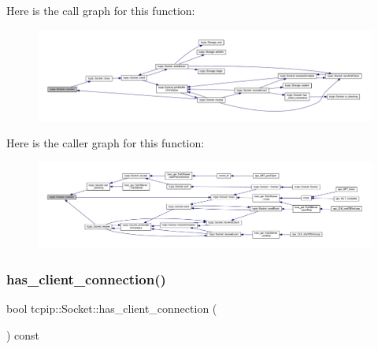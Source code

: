 Here is the call graph for this function\+:
\nopagebreak
\begin{figure}[H]
\begin{center}
\leavevmode
\includegraphics[width=350pt]{classtcpip_1_1_socket_a8f89d187776729d15db3ba5c99c36acd_cgraph}
\end{center}
\end{figure}
Here is the caller graph for this function\+:
\nopagebreak
\begin{figure}[H]
\begin{center}
\leavevmode
\includegraphics[width=350pt]{classtcpip_1_1_socket_a8f89d187776729d15db3ba5c99c36acd_icgraph}
\end{center}
\end{figure}
\mbox{\label{classtcpip_1_1_socket_a78436cfed4ad686180491c38e88ebfc3}} 
\subsubsection{\texorpdfstring{has\+\_\+client\+\_\+connection()}{has\_client\_connection()}}
{\footnotesize\ttfamily bool tcpip\+::\+Socket\+::has\+\_\+client\+\_\+connection (\begin{DoxyParamCaption}{ }\end{DoxyParamCaption}) const}

